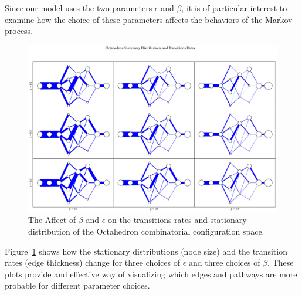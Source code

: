 Since our model uses the two parameters $\epsilon$ and $\beta$, it is of particular interest to examine how the choice of these parameters affects the behaviors of the Markov process. 
\begin{figure}[ht]
\label{fig:OctaPiGrid}
\centering
  \includegraphics[scale=0.22]{images/octahedron_pi_Q_grid.eps}
\caption{The Affect of $\beta$ and $\epsilon$ on the transitions rates and stationary distribution of the Octahedron combinatorial configuration space.}
\end{figure}
Figure~\ref{fig:OctaPiGrid} shows how the stationary distributions (node size) and the transition rates (edge thickness) change for three choices of $\epsilon$ and three choices of $\beta$. These plots provide and effective way of visualizing which edges and pathways are more probable for different parameter choices. 

